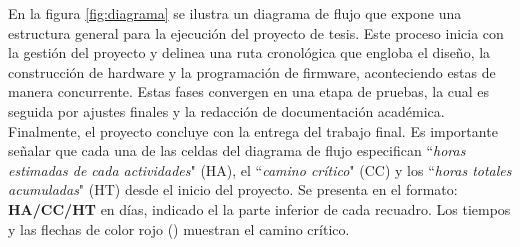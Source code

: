%

%
%
%

%

En la figura \ref{fig:diagrama} se ilustra un diagrama de flujo que expone una estructura general para la ejecución del proyecto de tesis. Este proceso inicia con la gestión del proyecto y delinea una ruta cronológica que engloba el diseño, la construcción de hardware y la programación de firmware, aconteciendo estas de manera concurrente. Estas fases convergen en una etapa de pruebas, la cual es seguida por ajustes finales y la redacción de documentación académica. Finalmente, el proyecto concluye con la entrega del trabajo final. Es importante señalar que cada una de las celdas del diagrama de flujo especifican ``\textit{horas estimadas de cada actividades}" (HA), el ``\textit{camino crítico}" (CC) y los ``\textit{horas totales acumuladas}" (HT) desde el inicio del proyecto. Se presenta en el formato: \textbf{HA/{\color{red}CC}/HT} en días, indicado el la parte inferior de cada recuadro. Los tiempos y las flechas de color rojo ({\color{red}\faArrowDown})  muestran el camino crítico.




